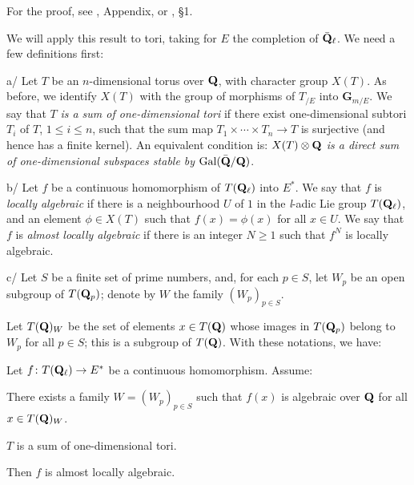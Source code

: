 For the proof, see \cite{lang-transc}, Appendix, or
\cite{serre-exponentielles}, \S1.

We will apply this result to tori, taking for $E$ the completion of
$\bar{\mathbf{Q}}_\ell$.  We need a few definitions first:

a/ Let $T$ be an $n$-dimensional torus over $\mathbf{Q}$, with character
group $X(T)$.  As before, we identify $X(T)$ with the group of
morphisms of $T_{/E}$ into $\mathbf{G}_{m/E}$.  We say that $T$
\emph{is a sum of one-dimensional tori} if there exist
one-dimensional subtori $T_i$ of $T$, $1\leq i\leq n$, such that the
sum map $T_1\times\cdots\times T_n\to T$ is surjective (and hence
has a finite kernel).  An equivalent condition is: $X(T)\mathbin{\otimes}\mathbf{Q}$
\emph{is a direct sum of one-dimensional subspaces stable by}
$\mathrm{Gal}(\bar{\mathbf{Q}}/\mathbf{Q})$.

b/ Let $f$ be a continuous homomorphism of $T(\mathbf{Q}_\ell)$ into
$E^*$.  We say that $f$ is \emph{locally algebraic} if there is a
neighbourhood $U$ of $1$ in the \textit{l}-adic Lie group
$T(\mathbf{Q}_\ell)$, and an element $\phi\in X(T)$ such that
$f(x)=\phi(x)$ for all $x\in U$.  We say that $f$ is \emph{almost
locally algebraic} if there is an integer $N\geq 1$ such that $f^N$
is locally algebraic.

c/ Let $S$ be a finite set of prime numbers, and, for each
$p\in S$, let $W_p$ be an open subgroup of $T(\mathbf{Q}_p)$; denote by $W$
the family $(W_p)_{p\in S}$.

Let $T(\mathbf{Q})_W$ be the set of elements $x\in T(\mathbf{Q})$ whose images in
$T(\mathbf{Q}_p)$ belong to $W_p$ for all $p\in S$; this is a subgroup of
$T(\mathbf{Q})$.  With these notations, we have:

\begin{proposition}[2]\label{prop:III.3.3.2}
Let $f\colon T(\mathbf{Q}_\ell)\to E^*$ be a continuous homomorphism.
Assume:
\begin{alist}
\item There exists a family $W=(W_p)_{p\in S}$ such that $f(x)$ is
algebraic over $\mathbf{Q}$ for all $x\in T(\mathbf{Q})_W$.
\item $T$ is a sum of one-dimensional tori.
\end{alist}
Then $f$ is almost locally algebraic.
\end{proposition}

